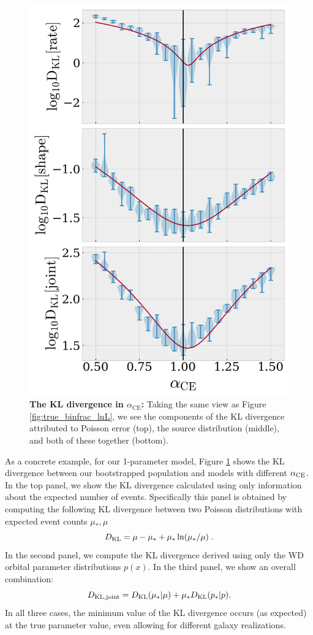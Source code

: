 \documentclass[twocolumn]{aastex631}
\newcommand*{\alphaCE}{\alpha_{\mathrm{CE}}}
\begin{document}
\begin{figure}
\includegraphics[width=3.375 in]{CEb60_m12i-000_inj_KL.png}
\caption{\label{fig:true_binfrac_kl}
\textbf{The KL divergence in $\alphaCE$:}
Taking the same view as Figure \ref{fig:true_binfrac_lnL},
    we see the components of the KL divergence attributed to
    Poisson error (top), the source distribution (middle),
    and both of these together (bottom).
}
\end{figure}

As a concrete example, for  our 1-parameter model,
Figure \ref{fig:true_binfrac_kl} shows the KL divergence between our bootstrapped population and models with different
$\alpha_{\rm CE}$.  In the top panel, we show the KL divergence calculated using only information about the expected
number of events.  Specifically
this panel is obtained by computing the following  KL divergence between two Poisson distributions with expected event
counts $\mu_*,\mu$
\begin{equation}
D_{\rm KL} = \mu-\mu_*  + \mu_*\ln(\mu_*/\mu)  \; .
\end{equation}
In the second panel, we compute the KL divergence derived using only the WD orbital parameter distributions $p(x)$.
In the third panel, we show an overall combination:
\begin{equation}
D_{\rm KL,joint} = D_{\rm KL}(\mu_*|\mu) + \mu_* D_{\rm KL}(p_*|p) .
\end{equation}
In all three cases, the minimum value of the KL divergence occurs (as expected) at the true parameter value, even
allowing for different galaxy realizations. 
\end{document}
